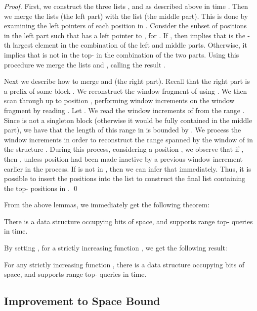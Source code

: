 \documentclass[runningheads]{llncs}
\begin{document}
\begin{proof}
First, we construct the three lists ,  and  as
described above in time .  Then we merge the lists 
(the left part) with the list  (the middle part).  This is done
by examining the left pointers of each position in .  Consider
the subset  of positions in the
left part such that  has a left pointer to , for
.  If , then implies that  is
the -th largest element in the combination of the left and
middle parts.  Otherwise, it implies that  is not in the
top- in the combination of the two parts.  Using this procedure we
merge the lists  and , calling the result .

Next we describe how to merge  and  (the right part).  Recall
that the right part is a prefix of some block .  We
reconstruct the window fragment of  using
.  We then scan through  up to
position , performing window increments on the window fragment by
reading .  Let .  We read the window increments of
 from the range .  Since
 is not a singleton block (otherwise it would be
fully contained in the middle part), we have that the length of this
range in  is bounded by .  We process the window
increments in order to reconstruct the range  spanned
by the window of  in the structure .  During
this process, considering a position , we observe
that if , then ,
unless position  had been made inactive by a previous window
increment earlier in the process.  If  is not in
, then we can infer that 
immediately.  Thus, it is possible to insert the positions
 into the list  to construct the final list 
containing the top- positions in .  \qed

\end{proof}

From the above lemmas, we immediately get the following theorem:

\begin{theorem}
There is a data structure occupying
 bits of space,
and supports range top- queries in  time.
\end{theorem}

By setting , for a strictly increasing
function , we get the following result:

\begin{corollary}
For any strictly increasing function , there is a data structure
occupying  bits of space, and
supports range top- queries in  time.
\end{corollary}

\subsection{Improvement to Space Bound}
\end{document}
